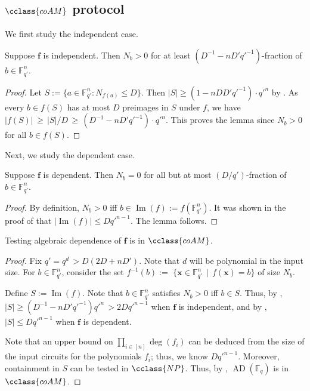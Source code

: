 \documentclass{toc}
\newcommand{\F}{\mathbb{F}}
\DeclareMathOperator{\im}{\mathrm{Im}}
\newcommand{\NP}{\cclass{NP}\xspace}  %
\newcommand{\coAM}{\cclass{coAM}\xspace}  %
\DeclareMathOperator{\AD}{\mathrm{AD}\xspace} %
\begin{document}
\subsection{\texorpdfstring{$\coAM$}{coAM} protocol}
We first study the independent case.
%

\begin{lemma}\label{lem-coam-1}
Suppose $\mathbf f$
%
is  %
independent.
Then $N_b>0$ for at least $(D^{-1} - nD'q'^{-1})$-fraction of $b\in \F_{q'}^n$.
\end{lemma}
\begin{proof}
Let $S:= \{a\in \F_{q'}^n: N_{f(a)}\leq D\}$.
Then $|S|\geq (1-n DD'q'^{-1})\cdot q'^{n}$ by .
As every $b\in f(S)$ has at most $D$ preimages in $S$ under $f$, we have 
$|f(S)| \,\ge\, |S|/D \,\ge\, (D^{-1}-nD'q'^{-1})\cdot q'^{n} $.
This proves the lemma since $N_b>0$ for all $b\in f(S)$.
\end{proof}

Next, we study the dependent case.

\begin{lemma}\label{lem-coam-2}
Suppose $\mathbf f$
%
is  %
dependent.
Then $N_b=0$ for all but at most $(D/q')$-fraction of $b\in \F_{q'}^n$.
\end{lemma}
\begin{proof}
%
By definition, %
$N_b>0$ iff $b\in \im(f):=f(\F_{q'}^n)$. It was shown in the proof of  that $|\im(f)| \le Dq'^{n-1}$. The lemma follows.
\end{proof}

\begin{theorem}[$\coAM$]\label{thm_coam}
Testing algebraic dependence of $\mathbf f$ is in $\coAM$.
\end{theorem}
\begin{proof}
Fix $q'=q^d \,> D(2D+nD')$. Note that $d$ will be polynomial in the input size.
For $b\in \F_{q'}^n$, consider the set 
$f^{-1}(b) :=$ $\{\mathbf x \in \F_{q'}^n \,\mid\, f(\mathbf x) = b \}$ of size $N_b$.

Define $S:= \im(f)$. Note that %
$b\in \F_{q'}^n$
%
satisfies   %
$N_b>0$ iff $b\in S$.
%
%
%
Thus, by ,
$|S|\ge (D^{-1} - nD'q'^{-1})q'^n\,> 2Dq'^{n-1}$ 
when $\mathbf f$ is independent, and
by , $|S|\le Dq'^{n-1}$
when $\mathbf f$ is dependent.

Note that an upper bound on $\prod_{i\in [n]}\deg(f_i)$ can be deduced from the size of the input circuits for 
%
the polynomials $f_i$; %
thus, we know $Dq'^{n-1}$. Moreover, containment in $S$ can be tested in $\NP$. Thus, by ,
%
$\AD(\F_q)$    %
is in $\coAM$.
\end{proof}
\end{document}
